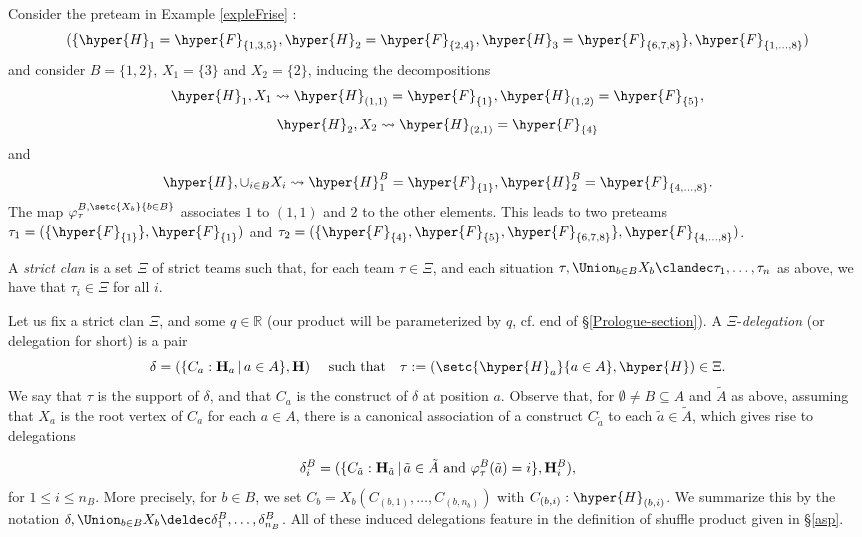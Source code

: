  
\begin{example} 
\label{expleFrise2} Consider the preteam in Example \ref{expleFrise} :
$$(\{\hyper{H}_1=\hyper{F}_{\{1,3,5\}},\hyper{H}_2=\hyper{F}_{\{2,4\}}, \hyper{H}_3=\hyper{F}_{\{6,7,8\}}\}, \hyper{F}_{\{1,\ldots,8\}})$$
and consider $B=\{1,2\}$, $X_1=\{3\}$ and $X_2=\{2\}$, inducing the decompositions 
$$\hyper{H}_1, X_1 \leadsto \hyper{H}_{(1,1)}=\hyper{F}_{\{1\}}, \hyper{H}_{(1,2)}=\hyper{F}_{\{5\}},$$
 $$\hyper{H}_2, X_2 \leadsto \hyper{H}_{(2,1)}=\hyper{F}_{\{4\}}$$ 
 and $$\hyper{H}, \cup_{i \in B} X_i \leadsto \hyper{H}_1^B=\hyper{F}_{\{1\}}, \hyper{H}_2^B=\hyper{F}_{\{4, \ldots, 8\}}.$$ The map $\varphi^{B,\setc{X_b}{b\in B}}_{\tau}$ associates $1$ to $(1,1)$ and $2$ to the other elements. This leads to two preteams $\tau_1=(\{\hyper{F}_{\{1\}}\},\hyper{F}_{\{1\}})$ and $\tau_2=(\{ \hyper{F}_{\{4\}}, \hyper{F}_{\{5\}}, \hyper{F}_{\{6,7,8\}}\}, \hyper{F}_{\{4, \ldots, 8\}})$. \demo
\end{example} 
 

 
 A {\it  strict clan} is a set $\Xi$ of strict teams such that, for each team $\tau\in \Xi$, and each situation $\tau,\Union_{b\in B}X_b\clandec \tau_1,\ldots,\tau_n$ as above, we have that $\tau_i\in \Xi$ for all $i$.  

Let us fix a strict clan $\Xi$, and   some $q\in{\mathbb R}$ (our product will be parameterized by $q$, cf. end of \S\ref{Prologue-section}).
A  $\Xi$-{\it delegation} (or delegation for short) is  a pair 
$$\delta=(\{C_a:{\bf H}_a\,|\, a\in A\},{\bf H}) \quad\mbox{
such that}\quad \tau:=(\setc{\hyper{H}_a}{a\in A},\hyper{H})\in \Xi.$$
We say that $\tau$ is the support of $\delta$, and that $C_a$ is the construct of $\delta$ at position $a$. 
 Observe that, for  $\emptyset \neq B\subseteq A$ and $\tilde{A}$  as above, assuming that $X_a$ is the root vertex of $C_a$ for each $a\in A$, there is a canonical association of a construct $C_{\tilde{a}}$ to each $\tilde{a}\in \tilde{A}$, which gives rise to delegations 
 
 \begin{equation} \label{deltas}
 \delta^B_i=(\{C_{\tilde{a}}:{\bf H}_{\tilde{a}}\,|\, \tilde{a}\in \tilde{A} \mbox{ and }\varphi^B_\tau(\tilde{a})=i\},{\bf H}_i^B),\end{equation} 
 for $1\leq i\leq n_B$.  More precisely, for $b\in B$, we set $C_b=X_b(C_{(b,1)},\ldots,C_{(b,n_b)})$ with $C_{(b,i)}:\hyper{H}_{(b,i)}$. We summarize this by the notation $\delta,\Union_{b\in B} X_b\deldec \delta^B_1,\ldots,\delta^B_{n_B}$. 
All of these induced delegations feature in the definition of shuffle product given in \S\ref{asp}.
 
